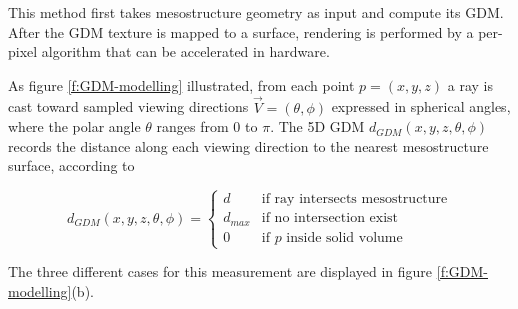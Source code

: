 This method first takes mesostructure geometry as input and compute its GDM. After the GDM texture is mapped to a surface, rendering is performed by a per-pixel algorithm that can be accelerated in hardware.


As figure \ref{f:GDM-modelling} illustrated, from each point $p=(x,y,z)$ a ray is cast toward sampled viewing directions $\vec{V}=(\theta,\phi)$ expressed in spherical angles, where the polar angle $\theta$ ranges from 0 to $\pi$. The 5D GDM $d_{GDM}(x,y,z,\theta,\phi)$ records the distance along each viewing direction to the nearest mesostructure surface, according to

\begin{equation}
	d_{GDM}(x,y,z,\theta,\phi)=
	\begin{cases}
		d & \text{if ray intersects mesostructure}\\
		d_{max} & \text{if no intersection exist}\\
		0 & \text{if $p$ inside solid volume}
	\end{cases}
\end{equation}

The three different cases for this measurement are displayed in figure \ref{f:GDM-modelling}(b).

